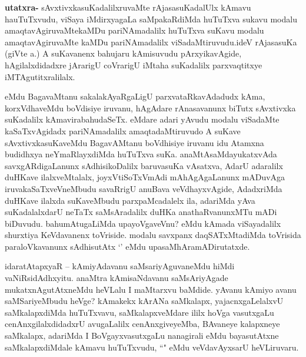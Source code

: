 \begin{artha}
\textbf{utatxra-} sAvxtivxkasuKadalilxruvaMte rAjasasuKadalUlx kAmavu hauTuTxvudu, viSaya iMdirxyagaLa saMpakaRdiMda huTuTxva sukavu modalu amaqtavAgiruvaMtekaMDu pariNAmadalilx huTuTxva suKavu modalu amaqtavAgiruvaMte kaMDu pariNAmadalilx viSadaMtiruvudu.ideV rAjasasuKa (giVte a.) A suKavanenx bahujaru kAmisuvudu pArxyikavAgide, hAgilalxdidadxre jArarigU coVrarigU iMtaha suKadalilx parxvaqtitxye iMTAgutitxralilalx. 
\end{artha}

\begin{artha}
eMdu BagavaMtanu sakalakAyaRgaLigU parxvataRkavAdadudx kAma, korxVdhaveMdu boVdisiye iruvanu, hAgAdare rAnasavanunx biTutx sAvxtivxka suKadalilx kAmavirabahudaSeTx. eMdare adari yAvudu modalu viSadaMte kaSaTxvAgidadx pariNAmadalilx amaqtadaMtiruvudo A suKave sAvxtivxkasuKaveMdu BagavAMtanu boVdhisiye iruvanu idu Atamxna budidhxya neYmaRlayxdiMda huTuTxva suKa. anaMtAsaMdayukatxvAda savxgARdigaLanunx sAdhisikoDalilx baruvasuKa vAsatxva, AdarU adaralilx duHKave ilalxveMtalalx, joyxVtiSoTxVmAdi mAhAgAgaLanunx mADuvAga iruvakaSaTxveVneMbudu savaRrigU anuBava veVdhayxvAgide, AdadxriMda duHKave ilalxda suKaveMbudu parxpaMcadalelx ila, adariMda yAva suKadalalxdarU neTaTx saMsAradalilx duHKa anathaRvanunxMTu mADi biDuvudu. bahumAtugaLiMda upayoVgaveVnu? eMdu kAmada viSayadalilx shurxtiya KeVdavanenx toVriside. modalu savxpanx daqSATxMtadiMda toVrisida paraloVkavanunx sAdhisutAtx `\stext' eMdu upasaMhAramADirutatxde.
\end{artha}

\begin{artha}
idaratAtapxyaR -- kAmiyAdavanu saMsariyAguvaneMdu hiMdi vaNiRsidAdhxyitu. anaMtra kAmisaNdavanu saMsAriyAgade mukatxnAgutAtxneMdu heVLalu I maMtarxvu baMdide.
yAvanu kAmiyo avanu saMSariyeMbudu heVge? kAmakekx kArANa saMkalapx, yajacnxgaLelalxvU saMkalapxdiMda huTuTxvavu, saMkalapxveMdare ililx hoVga vasutxgaLu cenAnxgilalxdidadxrU avugaLalilx cenAnxgiveyeMba, BAvaneye kalapxneye saMkalapx, adariMda I BoVgayxvasutxgaLu nanagirali eMdu bayasutAtxne saMkalapxdiMdale kAmavu huTuTxvudu, ``\stext" eMdu veVdavAyxsarU heVLiruvaru.
\end{artha}


